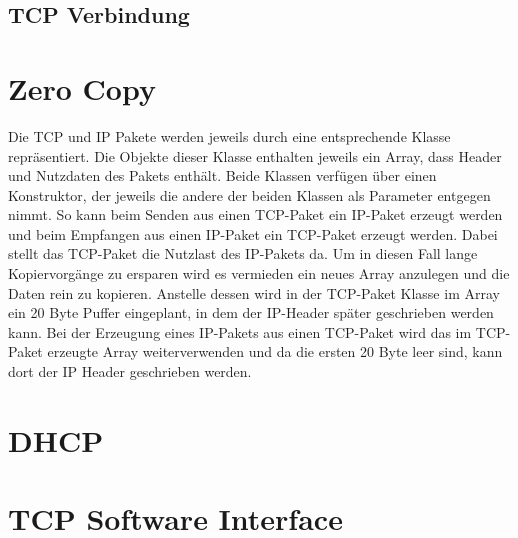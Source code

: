 \subsection{TCP Verbindung}

\section{Zero Copy}
Die TCP und IP Pakete werden jeweils durch eine entsprechende Klasse repräsentiert. Die Objekte dieser Klasse enthalten jeweils ein Array, dass Header und Nutzdaten des Pakets enthält. Beide Klassen verfügen über einen Konstruktor, der jeweils die andere der beiden Klassen als Parameter entgegen nimmt. So kann beim Senden aus einen TCP-Paket ein IP-Paket erzeugt werden und beim Empfangen aus einen IP-Paket ein TCP-Paket erzeugt werden. Dabei stellt das TCP-Paket die Nutzlast des IP-Pakets da. Um in diesen Fall lange Kopiervorgänge zu ersparen wird es vermieden ein neues Array anzulegen und die Daten rein zu kopieren. Anstelle dessen wird in der TCP-Paket Klasse im Array ein 20 Byte Puffer eingeplant, in dem der IP-Header später geschrieben werden kann. Bei der Erzeugung eines IP-Pakets aus einen TCP-Paket wird das im TCP-Paket erzeugte Array weiterverwenden und da die ersten 20 Byte leer sind, kann dort der IP Header geschrieben werden. 


\section{DHCP}

\section{TCP Software Interface}

